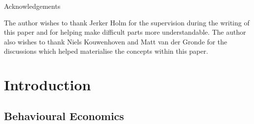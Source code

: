 \documentclass[a4paper,10pt]{article}
\numberwithin{equation}{section}
\begin{document}
\vspace{.4cm}

\begin{center}
\begin{minipage}[t]{0.7\textwidth}
\begin{bf}
Acknowledgements
\end{bf}
\newline
\newline
The author wishes to thank Jerker Holm for the supervision during the writing of this paper and for helping make difficult parts more understandable. The author also wishes to thank Niels Kouwenhoven and Matt van der Gronde for the discussions which helped materialise the concepts within this paper.
\end{minipage}
\end{center}

\vspace{.6cm}

\newpage

\label{sec:Contents}
\renewcommand{\contentsname}{Contents\\} 
\tableofcontents

\newpage

\section{Introduction}
\label{sec:Introduction}
\subsection{Behavioural Economics}
\label{sec:Behavioural Economics}
\end{document}
